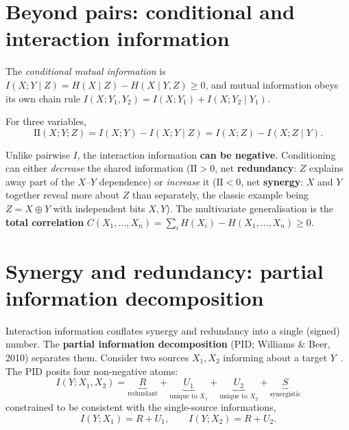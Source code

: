 \documentclass[11pt]{article}
\begin{document}
\section{Beyond pairs: conditional and interaction information}
The \emph{conditional mutual information} is
$I(X;Y\mid Z)=H(X\mid Z)-H(X\mid Y,Z)\ge0$, and mutual information obeys its own chain rule
$I(X;Y_1,Y_2)=I(X;Y_1)+I(X;Y_2\mid Y_1)$.

\begin{definition}
For three variables,
\begin{equation}
  \mathrm{II}(X;Y;Z)=I(X;Y)-I(X;Y\mid Z)=I(X;Z)-I(X;Z\mid Y).
\end{equation}
\end{definition}
Unlike pairwise $I$, the interaction information \textbf{can be negative}. Conditioning can either
\emph{decrease} the shared information ($\mathrm{II}>0$, net \textbf{redundancy}: $Z$ explains away
part of the $X$--$Y$ dependence) or \emph{increase} it ($\mathrm{II}<0$, net \textbf{synergy}: $X$
and $Y$ together reveal more about $Z$ than separately, the classic example being
$Z=X\oplus Y$ with independent bits $X,Y$). The multivariate generalisation is the
\textbf{total correlation} $C(X_1,\dots,X_n)=\sum_i H(X_i)-H(X_1,\dots,X_n)\ge0$.

\section{Synergy and redundancy: partial information decomposition}
Interaction information conflates synergy and redundancy into a single (signed) number. The
\textbf{partial information decomposition} (PID; Williams \& Beer, 2010) separates them. Consider
two sources $X_1,X_2$ informing about a target $Y$~\cite{williams2010}. The PID posits four
non-negative atoms:
\begin{equation}
  \boxed{\;I(Y;X_1,X_2)=\underbrace{R}_{\text{redundant}}
   +\underbrace{U_1}_{\text{unique to }X_1}
   +\underbrace{U_2}_{\text{unique to }X_2}
   +\underbrace{S}_{\text{synergistic}}\;}
  \label{eq:pid}
\end{equation}
constrained to be consistent with the single-source informations,
\begin{equation}
  I(Y;X_1)=R+U_1,\qquad I(Y;X_2)=R+U_2.
  \label{eq:pid-consistency}
\end{equation}
\end{document}
